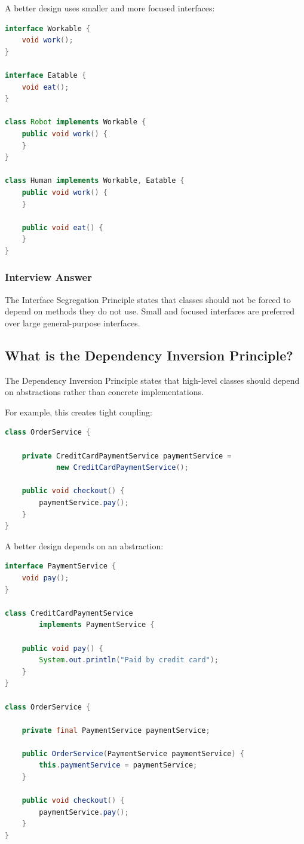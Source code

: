 \documentclass[12pt,a4paper]{article}
\begin{document}
A better design uses smaller and more focused interfaces:

\begin{lstlisting}[language=Java]
interface Workable {
    void work();
}

interface Eatable {
    void eat();
}

class Robot implements Workable {
    public void work() {
    }
}

class Human implements Workable, Eatable {
    public void work() {
    }

    public void eat() {
    }
}
\end{lstlisting}

\subsubsection*{Interview Answer}

The Interface Segregation Principle states that classes should not be forced
to depend on methods they do not use. Small and focused interfaces are
preferred over large general-purpose interfaces.

\subsection{What is the Dependency Inversion Principle?}

The Dependency Inversion Principle states that high-level classes should
depend on abstractions rather than concrete implementations.

For example, this creates tight coupling:

\begin{lstlisting}[language=Java]
class OrderService {

    private CreditCardPaymentService paymentService =
            new CreditCardPaymentService();

    public void checkout() {
        paymentService.pay();
    }
}
\end{lstlisting}

A better design depends on an abstraction:

\begin{lstlisting}[language=Java]
interface PaymentService {
    void pay();
}

class CreditCardPaymentService
        implements PaymentService {

    public void pay() {
        System.out.println("Paid by credit card");
    }
}

class OrderService {

    private final PaymentService paymentService;

    public OrderService(PaymentService paymentService) {
        this.paymentService = paymentService;
    }

    public void checkout() {
        paymentService.pay();
    }
}
\end{lstlisting}
\end{document}
